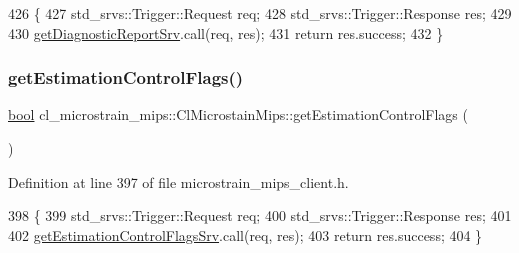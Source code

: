 \begin{DoxyCode}
426     \{
427         std\_srvs::Trigger::Request req;
428         std\_srvs::Trigger::Response res;
429 
430         \hyperlink{classcl__microstrain__mips_1_1ClMicrostainMips_a3d4329c798aa4b7cab1320f35f270192}{getDiagnosticReportSrv}.call(req, res);
431         \textcolor{keywordflow}{return} res.success;
432     \}
\end{DoxyCode}
\mbox{\label{classcl__microstrain__mips_1_1ClMicrostainMips_ad0a8eda5c19617250d3392593d0c8986}} 
\subsubsection{\texorpdfstring{get\+Estimation\+Control\+Flags()}{getEstimationControlFlags()}}
{\footnotesize\ttfamily \hyperlink{classbool}{bool} cl\+\_\+microstrain\+\_\+mips\+::\+Cl\+Microstain\+Mips\+::get\+Estimation\+Control\+Flags (\begin{DoxyParamCaption}{ }\end{DoxyParamCaption})\hspace{0.3cm}{\ttfamily [inline]}}



Definition at line 397 of file microstrain\+\_\+mips\+\_\+client.\+h.


\begin{DoxyCode}
398     \{
399         std\_srvs::Trigger::Request req;
400         std\_srvs::Trigger::Response res;
401 
402         \hyperlink{classcl__microstrain__mips_1_1ClMicrostainMips_a64039ee26cf8a290b3c22b787b8868a5}{getEstimationControlFlagsSrv}.call(req, res);
403         \textcolor{keywordflow}{return} res.success;
404     \}
\end{DoxyCode}
\mbox{\label{classcl__microstrain__mips_1_1ClMicrostainMips_a3a0425423b14461be52bc9b6c0f118bc}} 
